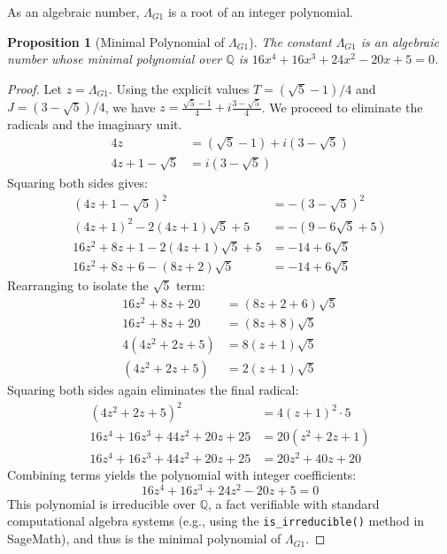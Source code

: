 \documentclass{amsart}
\theoremstyle{plain}
\newtheorem{proposition}[theorem]{Proposition}
\theoremstyle{definition}
\theoremstyle{remark}
\newcommand{\LambdaG}{\Lambda_{G1}}
\begin{document}
As an algebraic number, $\LambdaG$ is a root of an integer polynomial.
\begin{proposition}[Minimal Polynomial of \texorpdfstring{$\LambdaG$}{Lambda\_G1}]
The constant $\LambdaG$ is an algebraic number whose minimal polynomial over $\mathbb{Q}$ is $16x^4 + 16x^3 + 24x^2 - 20x + 5 = 0$.
\end{proposition}
\begin{proof}
Let $z = \LambdaG$. Using the explicit values $T = (\sqrt{5}-1)/4$ and $J = (3-\sqrt{5})/4$, we have $z = \frac{\sqrt{5}-1}{4} + i\frac{3-\sqrt{5}}{4}$. We proceed to eliminate the radicals and the imaginary unit.
\begin{align*}
    4z &= (\sqrt{5}-1) + i(3-\sqrt{5}) \\
    4z + 1 - \sqrt{5} &= i(3-\sqrt{5})
\end{align*}
Squaring both sides gives:
\begin{align*}
    (4z+1 - \sqrt{5})^2 &= -(3-\sqrt{5})^2 \\
    (4z+1)^2 - 2(4z+1)\sqrt{5} + 5 &= -(9 - 6\sqrt{5} + 5) \\
    16z^2 + 8z + 1 - 2(4z+1)\sqrt{5} + 5 &= -14 + 6\sqrt{5} \\
    16z^2 + 8z + 6 - (8z+2)\sqrt{5} &= -14 + 6\sqrt{5}
\end{align*}
Rearranging to isolate the $\sqrt{5}$ term:
\begin{align*}
    16z^2 + 8z + 20 &= (8z+2+6)\sqrt{5} \\
    16z^2 + 8z + 20 &= (8z+8)\sqrt{5} \\
    4(4z^2 + 2z + 5) &= 8(z+1)\sqrt{5} \\
    (4z^2 + 2z + 5) &= 2(z+1)\sqrt{5}
\end{align*}
Squaring both sides again eliminates the final radical:
\begin{align*}
    (4z^2 + 2z + 5)^2 &= 4(z+1)^2 \cdot 5 \\
    16z^4 + 16z^3 + 44z^2 + 20z + 25 &= 20(z^2 + 2z + 1) \\
    16z^4 + 16z^3 + 44z^2 + 20z + 25 &= 20z^2 + 40z + 20
\end{align*}
Combining terms yields the polynomial with integer coefficients:
\[ 16z^4 + 16z^3 + 24z^2 - 20z + 5 = 0 \]
This polynomial is irreducible over $\mathbb{Q}$, a fact verifiable with standard computational algebra systems (e.g., using the \texttt{is\_irreducible()} method in SageMath), and thus is the minimal polynomial of $\LambdaG$.
\end{proof}
\end{document}
